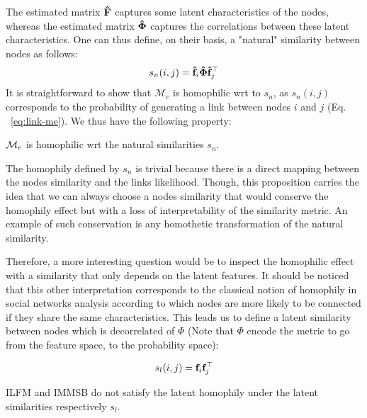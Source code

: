 The estimated matrix $\mathbf{\hat{F}}$ captures some latent characteristics of the nodes, whereas the estimated matrix $\mathbf{\hat{\Phi}}$ captures the correlations between these latent characteristics. One can thus define, on their basis, a "natural" similarity between nodes as follows:
%
\begin{equation}
s_n(i,j) = \mathbf{\hat{f}}_{i} \mathbf{\hat{\Phi}} \mathbf{\hat{f}}_j^\top \nonumber
\end{equation}
%
It is straightforward to show that $\mathcal{M}_e$ is homophilic wrt to $s_n$, as $s_n(i,j)$ corresponds to the probability of generating a link between nodes $i$ and $j$ (Eq.   ~\ref{eq:link-me}). We thus have the following property:
%
\begin{proposition}[] $\mathcal{M}_e$ is homophilic wrt the natural similarities $s_n$.
\end{proposition}

The homophily defined by $s_n$ is trivial because there is a direct mapping between the nodes similarity and the links likelihood. Though, this proposition carries the idea that we can always choose a nodes similarity that would conserve the homophily effect but with a loss of interpretability of the similarity metric. An example of such conservation is any homothetic transformation of the natural similarity.

Therefore, a more interesting question would be to inspect the homophilic effect with a similarity that only depends on the latent features. It should be noticed that this other interpretation corresponds to the classical notion of homophily in social networks analysis according to which nodes are more likely to be connected if they share the same characteristics. This leads us to define a latent similarity between nodes which is decorrelated of $\Phi$ (Note that $\Phi$ encode the metric to go from the feature space, to the probability space):

\begin{align}
&s_l(i,j) = \mat{f}_{i} \mat{f}_j^\top \nonumber \\
\label{eq:latent-sim}
\end{align}


\begin{proposition}[]
	ILFM and IMMSB do not satisfy the latent homophily under the latent similarities respectively $s_l$.
\end{proposition}

